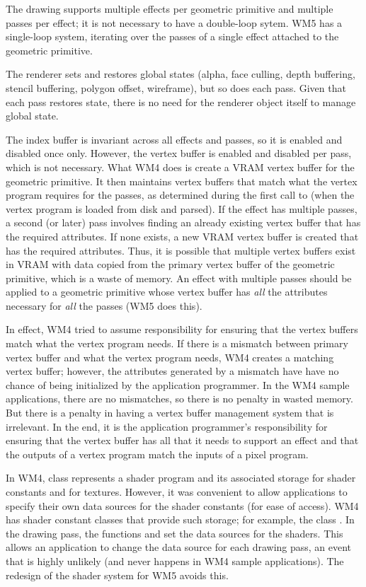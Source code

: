 \documentclass{article}
\begin{document}
The drawing supports multiple effects per geometric primitive and multiple
passes per effect; it is not necessary to have a double-loop sytem.  WM5
has a single-loop system, iterating over the passes of a single effect
attached to the geometric primitive.

The renderer sets and restores global states (alpha, face culling, depth
buffering, stencil buffering, polygon offset, wireframe), but so does each
pass.  Given that each pass restores state, there is no need for the renderer
object itself to manage global state.

The index buffer is invariant across all effects and passes, so it is enabled
and disabled once only.  However, the vertex buffer is enabled and disabled
per pass, which is not necessary.  What WM4 does is create a VRAM vertex
buffer for the geometric primitive.  It then maintains vertex buffers
that match what the vertex program requires for the passes, as determined
during the first call to  (when the vertex program is
loaded from disk and parsed).  If the effect has multiple passes, a second
(or later) pass involves finding an already existing vertex buffer that has
the required attributes.  If none exists, a new VRAM vertex buffer is created
that has the required attributes.  Thus, it is possible that multiple vertex
buffers exist in VRAM with data copied from the primary vertex buffer of the
geometric primitive, which is a waste of memory.  An effect with multiple
passes should be applied to a geometric primitive whose vertex buffer has
{\em all} the attributes necessary for {\em all} the passes (WM5 does this).

In effect, WM4 tried to assume responsibility for ensuring that the vertex
buffers match what the vertex program needs.  If there is a mismatch between
primary vertex buffer and what the vertex program needs, WM4 creates a
matching vertex buffer; however, the attributes generated by a mismatch have
have no chance of being initialized by the application programmer.  In the
WM4 sample applications, there are no mismatches, so there is no penalty in
wasted memory.  But there is a penalty in having a vertex buffer management
system that is irrelevant.  In the end, it is the application programmer's
responsibility for ensuring that the vertex buffer has all that it needs to
support an effect and that the outputs of a vertex program match the inputs
of a pixel program.

In WM4, class  represents a shader program and its associated
storage for shader constants and for textures.  However, it was convenient
to allow applications to specify their own data sources for the shader
constants (for ease of access).  WM4 has shader constant classes that
provide such storage; for example, the class .  In the
drawing pass, the functions  and
 set the data sources for the
shaders.  This allows an application to change the data source for each
drawing pass, an event that is highly unlikely (and never happens in WM4
sample applications).  The redesign of the shader system for WM5 avoids
this.
\end{document}
